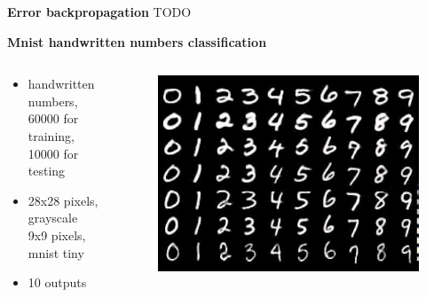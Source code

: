 \documentclass[xcolor=dvipsnames]{beamer}
\begin{document}
\begin{frame}{\bf Error backpropagation}
TODO
\end{frame}


\begin{frame}{\bf Mnist handwritten numbers classification}

\begin{columns}


    \begin{column}{0.5\textwidth}

        \begin{itemize}
            \item handwritten numbers, \\
                60000 for training, \\
                10000 for testing
            \item 28x28 pixels, grayscale \\
                  9x9 pixels, mnist tiny
            \item 10 outputs
        \end{itemize}

    \end{column}

    \begin{column}{0.5\textwidth}

    \begin{figure}
      \includegraphics[scale=0.23]{../../pictures/mnist.jpg}
    \end{figure}

    \end{column}


\end{columns}


\end{frame}
\end{document}
